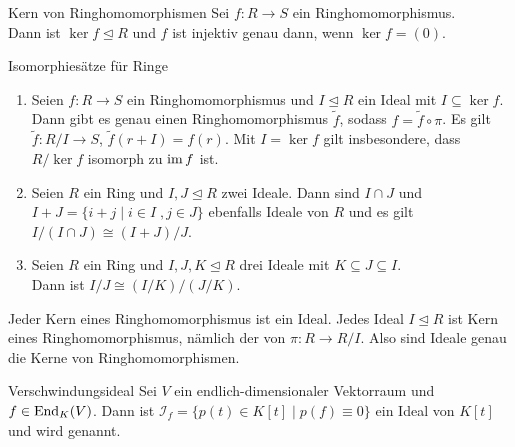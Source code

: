 \begin{Lemma}{Kern von Ringhomomorphismen}
    Sei $f: R \rightarrow S$ ein Ringhomomorphismus. \\
    Dann ist $\ker f \trianglelefteq R$ und $f$ ist injektiv genau dann,
    wenn $\ker f = (0)$.
\end{Lemma}

\begin{Satz}{Isomorphiesätze für Ringe}
    \begin{enumerate}
        \item
        Seien $f: R \rightarrow S$ ein Ringhomomorphismus
        und $I \trianglelefteq R$ ein Ideal mit $I \subseteq \ker f$.
        Dann gibt es genau einen Ringhomomorphismus $\widetilde{f}$, sodass
        $f = \widetilde{f} \circ \pi$.
        Es gilt $\widetilde{f}: R/I \rightarrow S$,
        $\widetilde{f}(r + I) = f(r)$.
        Mit $I = \ker f$ gilt insbesondere, dass $R/\ker f$ isomorph
        zu $\operatorname{im} f$ ist.

        \item
        Seien $R$ ein Ring und $I, J \trianglelefteq R$ zwei Ideale.
        Dann sind $I \cap J$ und \\
        $I + J = \{i + j \;|\; i \in I\;, j \in J\}$
        ebenfalls Ideale von $R$ und es gilt
        $I/(I \cap J) \cong (I + J)/J$.

        \item
        Seien $R$ ein Ring und $I, J, K \trianglelefteq R$ drei Ideale
        mit $K \subseteq J \subseteq I$. \\
        Dann ist $I/J \cong (I/K)/(J/K)$.
    \end{enumerate}
\end{Satz}

\begin{Bem}
    Jeder Kern eines Ringhomomorphismus ist ein Ideal.
    Jedes Ideal $I \trianglelefteq R$ ist Kern eines Ringhomomorphismus,
    nämlich der von $\pi: R \rightarrow R/I$.
    Also sind Ideale genau die Kerne von Ringhomomorphismen.
\end{Bem}

\pagebreak

\begin{Def}{Verschwindungsideal}
    Sei $V$ ein endlich-dimensionaler Vektorraum und $f \in \operatorname{End}_K(V)$.
    Dann ist
    $\mathcal{I}_f = \{p(t) \in K[t] \;|\; p(f) \equiv 0\}$
    ein Ideal von $K[t]$ und wird  genannt.
\end{Def}

